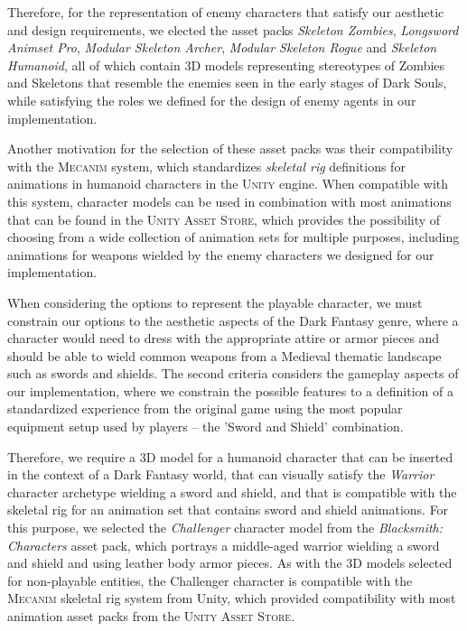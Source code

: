 Therefore, for the representation of enemy characters that satisfy our aesthetic and design requirements, we elected the asset packs \emph{Skeleton Zombies}, \emph{Longsword Animset Pro}, \emph{Modular Skeleton Archer}, \emph{Modular Skeleton Rogue} and \emph{Skeleton Humanoid}, all of which contain 3D models representing stereotypes of Zombies and Skeletons that resemble the enemies seen in the early stages of Dark Souls, while satisfying the roles we defined for the design of enemy agents in our implementation.

Another motivation for the selection of these asset packs was their compatibility with the \textsc{Mecanim} system, which standardizes \emph{skeletal rig} definitions for animations in humanoid characters in the \textsc{Unity} engine. When compatible with this system, character models can be used in combination with most animations that can be found in the \textsc{Unity Asset Store}, which provides the possibility of choosing from a wide collection of animation sets for multiple purposes, including animations for weapons wielded by the enemy characters we designed for our implementation.



When considering the options to represent the playable character, we must constrain our options to the aesthetic aspects of the Dark Fantasy genre, where a character would need to dress with the appropriate attire or armor pieces and should be able to wield common weapons from a Medieval thematic landscape such as swords and shields. The second criteria considers the gameplay aspects of our implementation, where we constrain the possible features to a definition of a standardized experience from the original game using the most popular equipment setup used by players -- the 'Sword and Shield' combination.

Therefore, we require a 3D model for a humanoid character that can be inserted in the context of a Dark Fantasy world, that can visually satisfy the \emph{Warrior} character archetype wielding a sword and shield, and that is compatible with the skeletal rig for an animation set that contains sword and shield animations. For this purpose, we selected the \emph{Challenger} character model from the \emph{Blacksmith: Characters} asset pack, which portrays a middle-aged warrior wielding a sword and shield and using leather body armor pieces. As with the 3D models selected for non-playable entities, the Challenger character is compatible with the \textsc{Mecanim} skeletal rig system from Unity, which provided compatibility with most animation asset packs from the \textsc{Unity Asset Store}.

